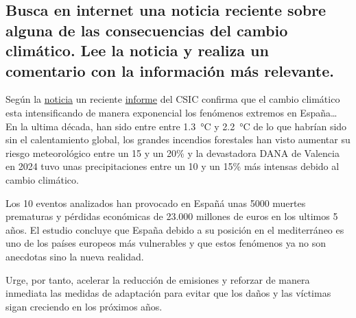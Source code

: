 
\fsection{\boldit{\textcolor{waveBlue2}{UTILIZA LAS TIC.}}} 
\subsection*{Busca en internet una noticia reciente sobre alguna de las consecuencias 
del cambio climático. Lee la noticia y realiza un comentario con la información 
más relevante.}

\begin{solution}
	Según la \href{https://www.rtve.es/noticias/20251116/diez-fenomenos-extremos-agravado-cambio-climatico-espana/16817452.shtml}{noticia} 
	un reciente \href{https://es.greenpeace.org/es/sala-de-prensa/informes/informe-diez-anos-10-eventos-extremos-como-el-cambio-climatico-golpea-a-espana/}{informe} del CSIC confirma que el cambio climático 
	esta intensificando de manera exponencial los fenómenos extremos en España\dots
	En la ultima década, han sido entre entre \SI{1,3}{\celsius} y \SI{2,2}{\celsius} 
	de lo que habrían sido sin el calentamiento global, los grandes incendios forestales
	han visto aumentar su riesgo meteorológico entre un 15 y un 20\% y la devastadora DANA
	de Valencia en 2024 tuvo unas precipitaciones entre un 10 y un 15\% más intensas 
	debido al cambio climático.
\vspace{1em}
	
	Los 10 eventos analizados han provocado en Españá unas 5000 muertes prematuras y pérdidas
	económicas de 23.000 millones de euros en los ultimos 5 años. El estudio concluye que España
	debido a su posición en el mediterráneo es uno de los países europeos más vulnerables y que 
	estos fenómenos ya no son anecdotas sino la nueva realidad.
\vspace{1em}

	Urge, por tanto, acelerar la reducción de emisiones y reforzar de manera 
	inmediata las medidas de adaptación para evitar que los daños y las víctimas 
	sigan creciendo en los próximos años.
\end{solution}
